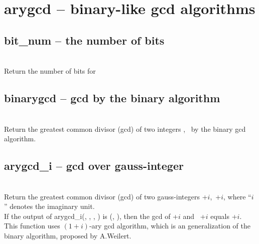 

 \section{arygcd -- binary-like gcd algorithms}
%
  \subsection{bit\_num -- the number of bits}
   \\
   \spacing
   \quad Return the number of bits for \\
%
  \subsection{binarygcd -- gcd by the binary algorithm}
   \\
   \spacing
   \quad Return the greatest common divisor (gcd) of two integers ,\  by the binary gcd algorithm.\\
%
  \subsection{arygcd\_i -- gcd over gauss-integer}
   \\
   \spacing
   \quad Return the greatest common divisor (gcd) of two gauss-integers +$i$,\ +$i$, where ``$i$'' denotes the imaginary unit. \\
   \spacing
   If the output of arygcd\_i(, , , ) is (, ), then
   the gcd of +$i$ and \ +$i$ equals +$i$.\\
   \negok This function uses $(1+i)$-ary gcd algorithm, which is an generalization of the binary algorithm, proposed by A.Weilert\cite{Weilert}.\\
%
